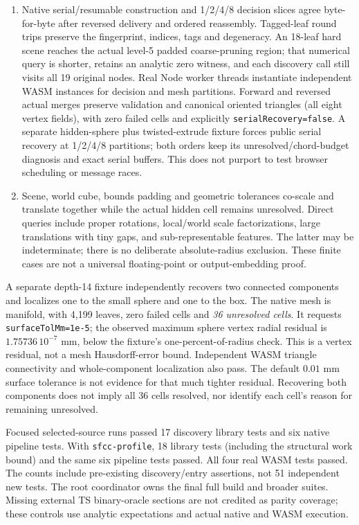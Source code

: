 \documentclass[11pt]{article}
\begin{document}
\begin{enumerate}[label=T\arabic*.]
ceilings 6 and 8 still reject hidden geometry with normal restrictions loosened,
blend refinement disabled and optional quality transformations disabled.
\item Native serial/resumable construction and 1/2/4/8 decision slices agree
byte-for-byte after reversed delivery and ordered reassembly. Tagged-leaf
round trips preserve the fingerprint, indices, tags and degeneracy. An
18-leaf hard scene reaches the actual level-5 padded coarse-pruning region;
that numerical query is shorter, retains an analytic zero witness, and each
discovery call still visits all 19 original nodes. Real Node worker threads
instantiate independent WASM instances for decision and mesh partitions.
Forward and reversed actual merges preserve validation and canonical oriented
triangles (all eight vertex fields), with zero failed cells and explicitly
\texttt{serialRecovery=false}. A separate hidden-sphere plus twisted-extrude
fixture forces public serial recovery at 1/2/4/8 partitions; both orders keep
its unresolved/chord-budget diagnosis and exact serial buffers. This does not
purport to test browser scheduling or message races.
\item Scene, world cube, bounds padding and geometric tolerances co-scale and
translate together while the actual hidden cell remains unresolved. Direct
queries include proper rotations, local/world scale factorizations, large
translations with tiny gaps, and sub-representable features. The latter may
be indeterminate; there is no deliberate absolute-radius exclusion. These
finite cases are not a universal floating-point or output-embedding proof.
\end{enumerate}

A separate depth-14 fixture independently recovers two connected components
and localizes one to the small sphere and one to the box. The native mesh is
manifold, with 4,199 leaves, zero failed cells and \emph{36 unresolved cells}.
It requests \texttt{surfaceTolMm=1e-5}; the observed maximum sphere vertex radial
residual is \(1.75736\,10^{-7}\) mm, below the fixture's one-percent-of-radius
check. This is a vertex residual, not a mesh Hausdorff-error bound.
Independent WASM triangle connectivity and whole-component localization
also pass. The default \(0.01\) mm surface tolerance is not evidence for that
much tighter residual. Recovering both components does not imply all 36 cells
resolved, nor identify each cell's reason for remaining unresolved.

Focused selected-source runs passed 17 discovery library tests and six native
pipeline tests. With \texttt{sfcc-profile}, 18 library tests (including the
structural work bound) and the same six pipeline tests passed. All four real
WASM tests passed. The counts include pre-existing discovery/entry assertions,
not 51 independent new tests. The root coordinator owns the final full build
and broader suites. Missing external TS binary-oracle sections are not credited
as parity coverage; these controls use analytic expectations and actual native
and WASM execution.
\end{document}
